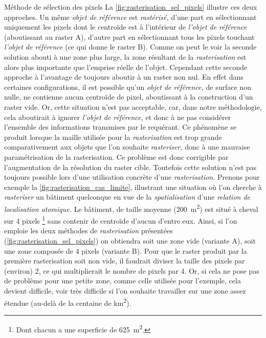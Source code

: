 Méthode de sélection des pixels
%
La \autoref{fig:rasterisation_sel_pixels} illustre ces deux
approches. Un même \emph{objet de référence} est \emph{rastérisé,}
d'une part en sélectionnant uniquement les pixels dont le centroïde
est à l'intérieur de \emph{l'objet de référence} (aboutissant au
raster \textcolor{RdBu-9-1}{\textsf{A}}), d'autre part en
sélectionnant tous les pixels touchant \emph{l'objet de référence} (ce
qui donne le raster \textcolor{RdBu-9-9}{\textsf{B}}). Comme on peut
le voir la seconde solution abouti à une zone plus large, la zone
résultant de la \emph{rasterisation} est alors plus importante que
l'emprise réelle de l'objet. Cependant cette seconde approche à
l'avantage de toujours aboutir à un raster non nul. En effet dans
certaines configurations, il est possible qu'un \emph{objet de
  référence,} de surface non nulle, ne contienne aucun centroïde de
pixel, aboutissant à la construction d'un raster vide. Or, cette
situation n'est pas acceptable, car, dans notre méthodologie, cela
aboutirait à ignorer \emph{l'objet de référence,} et donc à ne pas
considérer l'ensemble des informations transmises par le requérant. Ce
phénomène se produit lorsque la maille utilisée pour la
\emph{rasterisation} est trop grande comparativement aux objets que
l'on souhaite \emph{rasteriser,} donc à une mauvaise paramétrisation
de la rasterisation. Ce problème est donc corrigible par
l'augmentation de la résolution du raster cible. Toutefois cette
solution n'est pas toujours possible lors d'une utilisation concrète
d'une \emph{rasterisation.} Prenons pour exemple la
\autoref{fig:rasterisation_cas_limite}, illustrant une situation où
l'on cherche à \emph{rasteriser} un bâtiment quelconque en vue de la
\emph{spatialisation} d'une \emph{relation de localisation atomique.}
Le bâtiment, de taille moyenne (\ie \SI{200}{\metre\squared}) est
situé à cheval sur 4 pixels \footnote{Dont chacun a une superficie de
  \SI{625}{\metre\squared}.} sans contenir de centroïde d'aucun
d'entre eux. Ainsi, si l'on emploie les deux méthodes de
\emph{rasterisation} présentées
(\autoref{fig:rasterisation_sel_pixels}) on obtiendra soit une zone
vide (variante \textcolor{RdBu-9-1}{\textsf{A}}), soit une zone
composée de 4 pixels (variante \textcolor{RdBu-9-9}{\textsf{B}}). Pour
que le raster produit par la première rasterisation soit non vide, il
faudrait diviser la taille des pixels par (environ) 2, ce qui
multiplierait le nombre de pixels par 4. Or, si cela ne pose pas de
problème pour une petite zone, comme celle utilisée pour l'exemple,
cela devient difficile, voir très difficile si l'on souhaite
travailler sur une zone assez étendue (au-delà de la centaine de
\si{\kilo\meter\squared}).

